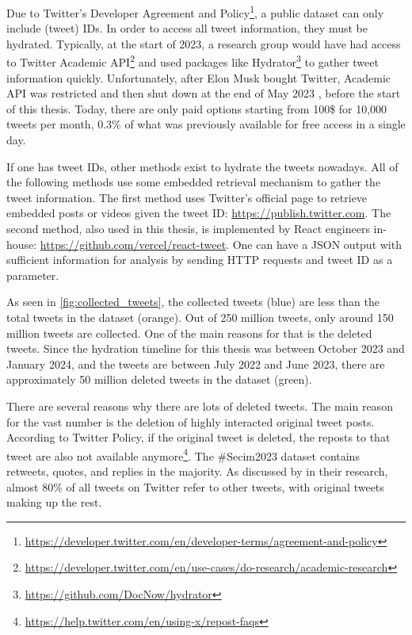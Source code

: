 Due to Twitter's Developer Agreement and Policy\footnote{\url{https://developer.twitter.com/en/developer-terms/agreement-and-policy}}, 
a public dataset can only include (tweet) IDs. In order to access all tweet information,
they must be hydrated. Typically, at the start of 2023, a research group would have had access 
to Twitter Academic API\footnote{\url{https://developer.twitter.com/en/use-cases/do-research/academic-research}} 
and used packages like Hydrator\footnote{\url{https://github.com/DocNow/hydrator}} to gather 
tweet information quickly. Unfortunately, after Elon Musk bought Twitter, Academic API was 
restricted and then shut down at the end of May 2023 \parencite{calma_twitter_academicAPI_elon_2023},
before the start of this thesis. Today, there are only paid 
options starting from 100\$ for 10,000 tweets per month, 0.3\% of what was previously 
available for free access in a single day. 

If one has tweet IDs, other methods exist to hydrate the tweets nowadays. 
All of the following methods use some embedded retrieval mechanism to gather 
the tweet information. The first method uses Twitter's official page to 
retrieve embedded posts or videos given the tweet ID\@: \url{https://publish.twitter.com}. 
The second method, also used in this thesis, is implemented by React engineers in-house\@:
\url{https://github.com/vercel/react-tweet}. One can have a JSON output with sufficient 
information for analysis by sending HTTP requests and tweet ID as a parameter. 

As seen in \autoref{fig:collected_tweets}, the collected tweets (blue) are less than 
the total tweets in the dataset (orange). 
Out of 250 million tweets, only around 150 million tweets are collected.
One of the main reasons for that is the deleted 
tweets. Since the hydration timeline for this thesis was between October 2023 and January 2024, 
and the tweets are between July 2022 and June 2023, there are approximately 50 million 
deleted tweets in the dataset (green). 

There are several reasons why there are lots of deleted tweets. The main reason for the 
vast number is the deletion of highly interacted original tweet posts. According to Twitter Policy, 
if the original tweet is deleted, the reposts to that tweet are also not available 
anymore\footnote{\url{https://help.twitter.com/en/using-x/repost-faqs}}. 
The \#Secim2023 dataset contains retweets, quotes, and replies in the majority.
As discussed by \textcite{pfeffer_twitter_24_Hours_just_another_day_2023} in their research, 
almost 80\% of all tweets on Twitter refer to other tweets, with original tweets making up the rest.

